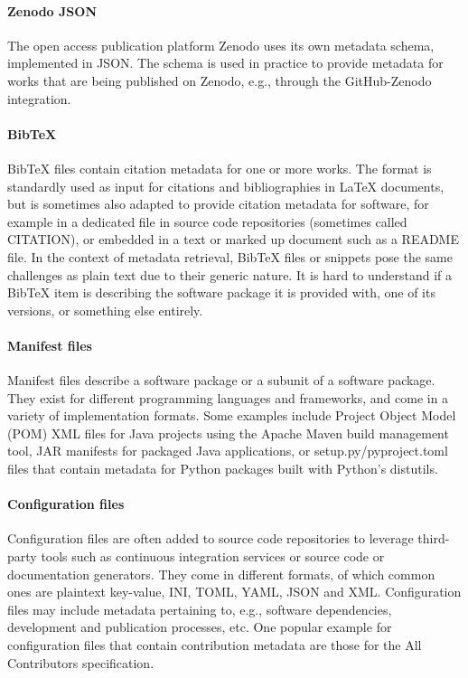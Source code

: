 \documentclass{article}
\begin{document}
\paragraph{Zenodo JSON}\label{par:metadata-formats-zenodo-json}
The open access publication platform Zenodo \cite{138880/BG42K9CX} uses its own metadata schema, implemented in JSON. The schema is used in practice to provide metadata for works that are being published on Zenodo, e.g., through the GitHub-Zenodo integration.



\paragraph{BibTeX}\label{par:metadata-formats-bibtex}
BibTeX files contain citation metadata for one or more works. The format is standardly used as input for citations and bibliographies in LaTeX documents, but is sometimes also adapted to provide citation metadata for software, for example in a dedicated file in source code repositories (sometimes called CITATION), or embedded in a text or marked up document such as a README file. In the context of metadata retrieval, BibTeX files or snippets pose the same challenges as plain text due to their generic nature. It is hard to understand if a BibTeX item is describing the software package it is provided with, one of its versions, or something else entirely.



\paragraph{Manifest files}\label{par:metadata-formats-manifests}
Manifest files describe a software package or a subunit of a software package. They exist for different programming languages and frameworks, and come in a variety of implementation formats. Some examples include Project Object Model (POM) XML files for Java projects using the Apache Maven build management tool, JAR manifests for packaged Java applications, or setup.py/pyproject.toml files that contain metadata for Python packages built with Python’s distutils.



\paragraph{Configuration files}\label{par:metadata-formats-config}
Configuration files are often added to source code repositories to leverage third-party tools such as continuous integration services or source code or documentation generators. They come in different formats, of which common ones are plaintext key-value, INI, TOML, YAML, JSON and XML. Configuration files may include metadata pertaining to, e.g., software dependencies, development and publication processes, etc. One popular example for configuration files that contain contribution metadata are those for the All Contributors specification.
\end{document}
